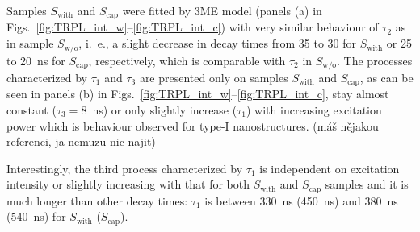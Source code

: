


Samples $S_\mathrm{with}$ and $S_\mathrm{cap}$ were fitted by 3ME model (panels (a) in Figs.~\ref{fig:TRPL_int_w}--\ref{fig:TRPL_int_c}) with very similar behaviour of $\tau_2$ as in sample $S_\mathrm{w/o}$, i.~e., a slight decrease in decay times from 35 to 30 for $S_\mathrm{with}$ or 25 to 20~ns for $S_\mathrm{cap}$, respectively, which is comparable with $\tau_2$ in $S_\mathrm{w/o}$.
%
The processes characterized by $\tau_1$ and $\tau_3$ are presented only on samples $S_\mathrm{with}$ and $S_\mathrm{cap}$, as can be seen in panels (b) in Figs.~\ref{fig:TRPL_int_w}--\ref{fig:TRPL_int_c}, stay almost constant ($\tau_3=8$~ns) or only slightly increase ($\tau_1$) with increasing excitation power which is behaviour observed for type-I nanostructures. (máš nějakou referenci, ja nemuzu nic najit)



Interestingly, the third process characterized by $\tau_1$ is independent on excitation intensity or slightly increasing with that for both $S_\mathrm{with}$ and $S_\mathrm{cap}$ samples and it is much longer than other decay times: $\tau_1$ is between 330~ns (450~ns) and 380~ns (540~ns) for $S_\mathrm{with}$ ($S_\mathrm{cap}$). 

